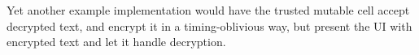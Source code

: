 \documentclass{article}
\newcommand{\trusted}[1]{*++[o][F=]{#1}}
\newcommand{\untrusted}[1]{*++[o][F-]{#1}}
\newcommand{\fullwidth}[1]{\noindent\checkoddpage\makebox[0pt][r]{\makebox[\dimexpr1in+\hoffset+\ifoddpage\oddsidemargin\else\evensidemargin\fi][l]{#1}}}
\newcommand{\truecenter}[1]{\fullwidth{\parbox[c]{\paperwidth}{#1}}}
\begin{document}
Yet another example implementation would have the trusted mutable cell accept decrypted text, and encrypt it in a timing-oblivious way, but present the UI with encrypted text and let it handle decryption.

%
%
\end{document}
